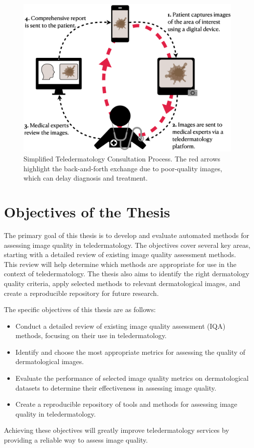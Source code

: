 \begin{figure}[ht]
    \centering
    \includegraphics[keepaspectratio,width=13cm]{img/TD_workflow.png}
    \caption{Simplified Teledermatology Consultation Process. The red arrows highlight the back-and-forth exchange due to poor-quality images, which can delay diagnosis and treatment.}
    \label{fig:TD_workflow}
\end{figure}

\section{Objectives of the Thesis}
\label{sec:Objectives}
The primary goal of this thesis is to develop and evaluate automated methods for assessing image quality in teledermatology. The objectives cover several key areas, starting with a detailed review of existing image quality assessment methods. This review will help determine which methods are appropriate for use in the context of teledermatology. The thesis also aims to identify the right dermatology quality criteria, apply selected methods to relevant dermatological images, and create a reproducible repository for future research. \par
\vspace{\baselineskip}
\noindent
The specific objectives of this thesis are as follows:
\begin{itemize}
    \item Conduct a detailed review of existing image quality assessment (IQA) methods, focusing on their use in teledermatology.
    \item  Identify and choose the most appropriate metrics for assessing the quality of dermatological images.
    \item Evaluate the performance of selected image quality metrics on dermatological datasets to determine their effectiveness in assessing image quality.
    \item Create a reproducible repository of tools and methods for assessing image quality in teledermatology.
\end{itemize}
\noindent
Achieving these objectives will greatly improve teledermatology services by providing a reliable way to assess image quality. \par
\clearpage
